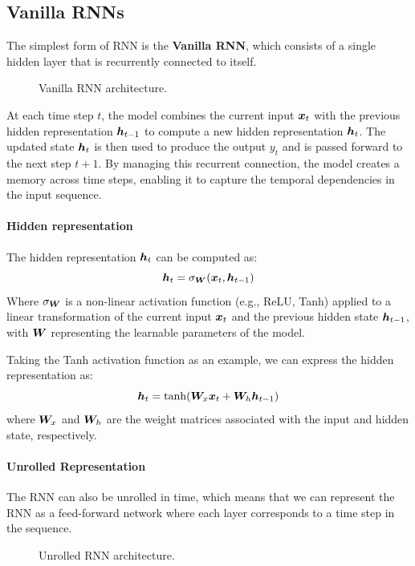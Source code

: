 \subsection{Vanilla RNNs}
The simplest form of RNN is the \textbf{Vanilla RNN}, which consists of a single hidden layer that is recurrently connected to itself.
\begin{figure}[H]
    \centering
    
    \caption{Vanilla RNN architecture.}
\end{figure}

At each time step $t$, the model combines the current input $\boldsymbol{x}_t$ with the previous hidden representation $\boldsymbol{h}_{t-1}$
to compute a new hidden representation $\boldsymbol{h}_t$.
The updated state $\boldsymbol{h}_t$ is then used to produce the output $y_t$ and is passed forward to the next step $t+1$.
By managing this recurrent connection, the model creates a memory across time steps, enabling it to capture the temporal dependencies in the input sequence.

\paragraph{Hidden representation}
The hidden representation $\boldsymbol{h}_t$ can be computed as:
\begin{equation}
    \boldsymbol{h}_t = \sigma_{\boldsymbol{W}}(\boldsymbol{x}_t, \boldsymbol{h}_{t-1})
\end{equation}
Where $\sigma_{\boldsymbol{W}}$ is a non-linear activation function (e.g., ReLU, Tanh) applied to a linear transformation of the current input $\boldsymbol{x}_t$ and the previous hidden state $\boldsymbol{h}_{t-1}$,
with $\boldsymbol{W}$ representing the learnable parameters of the model.

Taking the Tanh activation function as an example, we can express the hidden representation as:
\begin{equation}
    \boldsymbol{h}_t = \tanh(\boldsymbol{W}_{x} \boldsymbol{x}_t + \boldsymbol{W}_{h} \boldsymbol{h}_{t-1})
\end{equation}
where $\boldsymbol{W}_{x}$ and $\boldsymbol{W}_{h}$ are the weight matrices associated with the input and hidden state, respectively.

\paragraph{Unrolled Representation}
The RNN can also be unrolled in time, which means that we can represent the RNN as a feed-forward network where each layer corresponds to a time step in the sequence.
\begin{figure}[H]
    \centering
    \scalebox{0.8}{
        
    }
    \caption{Unrolled RNN architecture.}
\end{figure}

